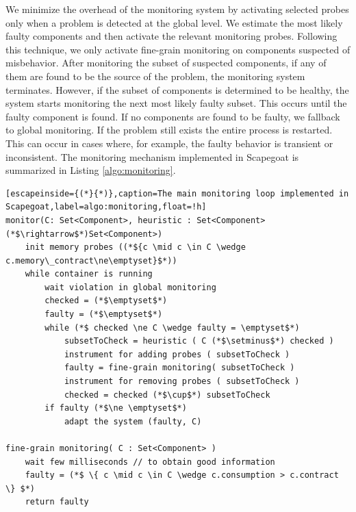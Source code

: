 We minimize the overhead of the monitoring system by activating selected probes only when a problem is detected at the global level.
We estimate the most likely faulty components and then activate the relevant monitoring probes.
Following this technique, we only activate fine-grain monitoring on components suspected of misbehavior.
After monitoring the subset of suspected components, 
if any of them are found to be the source of the problem, the monitoring system terminates.
However, if the subset of components is determined to be healthy, the system starts monitoring the next most likely faulty subset.
This occurs until the faulty component is found.
If no components are found to be faulty, we fallback to global monitoring. If the problem still exists the entire process is restarted. This can occur in cases where, for example, the faulty behavior is transient or inconsistent.
The monitoring mechanism implemented in Scapegoat is summarized in Listing \ref{algo:monitoring}.


\begin{lstlisting}[escapeinside={(*}{*)},caption=The main monitoring loop implemented in Scapegoat,label=algo:monitoring,float=!h]
monitor(C: Set<Component>, heuristic : Set<Component>(*$\rightarrow$*)Set<Component>)
	init memory probes ((*${c \mid c \in C \wedge c.memory\_contract\ne\emptyset}$*))
	while container is running
		wait violation in global monitoring
		checked = (*$\emptyset$*)
		faulty = (*$\emptyset$*)
		while (*$ checked \ne C \wedge faulty = \emptyset$*)
			subsetToCheck = heuristic ( C (*$\setminus$*) checked )
			instrument for adding probes ( subsetToCheck )
			faulty = fine-grain monitoring( subsetToCheck )
			instrument for removing probes ( subsetToCheck )
			checked = checked (*$\cup$*) subsetToCheck
		if faulty (*$\ne \emptyset$*)
			adapt the system (faulty, C)

fine-grain monitoring( C : Set<Component> )
	wait few milliseconds // to obtain good information
	faulty = (*$ \{ c \mid c \in C \wedge c.consumption > c.contract \} $*)
	return faulty
\end{lstlisting}


